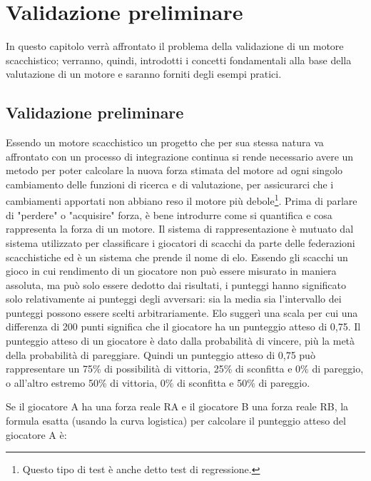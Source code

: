 \chapter{Validazione preliminare} %
%


\begin{citazione}
In questo capitolo verrà affrontato il problema della validazione di un motore scacchistico; verranno, quindi, introdotti i concetti fondamentali alla base della valutazione di un motore e saranno forniti 
degli esempi pratici.
\end{citazione}

\newpage
\section*{Validazione preliminare}
Essendo un motore scacchistico un progetto che per sua stessa natura va affrontato con un processo di integrazione continua si rende necessario avere un metodo 
per poter calcolare la nuova forza stimata del motore  ad ogni singolo cambiamento  delle funzioni di ricerca e di valutazione, per assicurarci che i cambiamenti apportati non abbiano reso il motore più debole\footnote{Questo tipo di test è anche detto test di regressione.}.
Prima di parlare di "perdere" o "acquisire" forza, è bene introdurre come si quantifica e cosa rappresenta la forza di un motore. Il sistema di rappresentazione è mutuato dal sistema utilizzato per classificare i 
giocatori di scacchi da parte delle federazioni scacchistiche ed è un sistema che prende il nome di elo. Essendo gli scacchi un gioco in cui  rendimento di un giocatore non può essere misurato in maniera assoluta,
ma può solo essere dedotto dai risultati, i punteggi hanno significato solo relativamente ai punteggi degli avversari: 
sia la media sia l'intervallo dei punteggi possono essere scelti arbitrariamente. Elo suggerì una scala per cui una differenza di 200 punti significa che il giocatore ha un punteggio atteso di 0,75.
Il punteggio atteso di un giocatore è dato dalla probabilità di vincere, più la metà della probabilità di pareggiare. Quindi un punteggio atteso di 0,75 può rappresentare un 75\% di possibilità di vittoria, 
25\% di sconfitta e 0\% di pareggio, o all'altro estremo 50\% di vittoria, 0\% di sconfitta e 50\% di pareggio.

Se il giocatore A ha una forza reale RA e il giocatore B una forza reale RB, la formula esatta (usando la curva logistica) per calcolare il punteggio atteso del giocatore A è:

